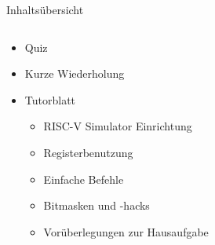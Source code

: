 \documentclass[
  german,            %
  aspectratio=169,    %
]{tumbeamer}
\begin{document}
\begin{frame}[c]{Inhaltsübersicht}{}
  \begin{columns}[c]
    \begin{column}{1\textwidth}
      \begin{itemize}
        \item Quiz
        \item Kurze Wiederholung
        \item Tutorblatt
        \begin{itemize}
          \item RISC-V Simulator Einrichtung
          \item Registerbenutzung
          \item Einfache Befehle
          \item Bitmasken und -hacks
          \item Vorüberlegungen zur Hausaufgabe
        \end{itemize}
      \end{itemize}
    \end{column}
  \end{columns}
\end{frame}
\end{document}
